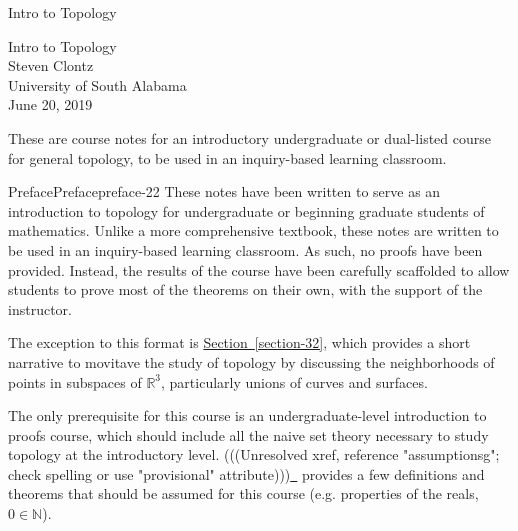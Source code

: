 \documentclass[oneside,10pt,]{book}
\begin{document}
\frontmatter
\thispagestyle{empty}
{\centering
\vspace*{0.28\textheight}
{\Huge Intro to Topology}\\}
\clearpage
\thispagestyle{empty}
\null%
\clearpage
\thispagestyle{empty}
{\centering
\vspace*{0.14\textheight}
{\Huge Intro to Topology}\\[3\baselineskip]
{\Large Steven Clontz}\\[0.5\baselineskip]
{\Large University of South Alabama}\\[3\baselineskip]
{\Large June 20, 2019}\\}
\clearpage
\thispagestyle{empty}
\hypertarget{colophon-15}{}
\null\clearpage
\hypertarget{p-14}{}%
These are course notes for an introductory undergraduate or dual-listed course for general topology, to be used in an inquiry-based learning classroom.%
%
%
\typeout{************************************************}
\typeout{************************************************}
%
\begin{preface}{Preface}{}{Preface}{}{}{preface-22}
\hypertarget{p-23}{}%
These notes have been written to serve as an introduction to topology for undergraduate or beginning graduate students of mathematics. Unlike a more comprehensive textbook, these notes are written to be used in an inquiry-based learning classroom. As such, no proofs have been provided. Instead, the results of the course have been carefully scaffolded to allow students to prove most of the theorems on their own, with the support of the instructor.%
\par
\hypertarget{p-24}{}%
The exception to this format is \hyperref[section-32]{Section~\ref{section-32}}, which provides a short narrative to movitave the study of topology by discussing the neighborhoods of points in subspaces of \(\mathbb R^3\), particularly unions of curves and surfaces.%
\par
\hypertarget{p-27}{}%
The only prerequisite for this course is an undergraduate-level introduction to proofs course, which should include all the naive set theory necessary to study topology at the introductory level. {(((Unresolved xref, reference "assumptionsg"; check spelling or use "provisional" attribute)))}\hyperlink{}{~} provides a few definitions and theorems that should be assumed for this course (e.g. properties of the reals, \(0\in\mathbb N\)).%
\end{preface}
\end{document}
